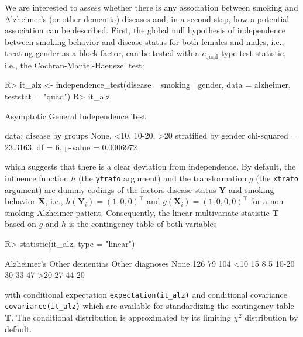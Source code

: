 \documentclass{article}
\newcommand{\Rcmd}[1]{\texttt{#1}}
\newcommand{\X}{\mathbf{X}}
\newcommand{\Y}{\mathbf{Y}}
\newcommand{\T}{\mathbf{T}}
\newenvironment{Schunk}{}{}
\begin{document}
We are interested to assess whether there is any association
between smoking and Alzheimer's (or other dementia) diseases and, in a
second step, how a potential association can be described. First,
the global null hypothesis of independence between smoking behavior and disease
status for both females and males, i.e., treating gender as a
block factor, can be tested with a $c_\text{quad}$-type test statistic, i.e., the 
Cochran-Mantel-Haenszel test:
\begin{Schunk}
\begin{Sinput}
R> it_alz <- independence_test(disease ~ smoking | gender, 
       data = alzheimer, teststat = "quad")
R> it_alz
\end{Sinput}
\begin{Soutput}
	Asymptotic General Independence Test

data:  disease by groups None, <10, 10-20, >20 
	 stratified by gender 
chi-squared = 23.3163, df = 6, p-value = 0.0006972
\end{Soutput}
\end{Schunk}
which suggests that there is a clear deviation from independence. 
By default, the influence function $h$ (the \Rcmd{ytrafo} argument)
and the transformation $g$ (the \Rcmd{xtrafo} argument)
are dummy codings of the factors disease status $\Y$ and smoking behavior $\X$, 
i.e., $h(\Y_i) = (1, 0, 0)^\top$ 
and $g(\X_i) = (1, 0, 0 ,0)^\top$ for a non-smoking Alzheimer patient. 
Consequently, the linear multivariate statistic $\T$ based on $g$ and $h$ 
is the contingency table of both variables 
\begin{Schunk}
\begin{Sinput}
R> statistic(it_alz, type = "linear")
\end{Sinput}
\begin{Soutput}
      Alzheimer's Other dementias Other diagnoses
None          126              79             104
<10            15               8               5
10-20          30              33              47
>20            27              44              20
\end{Soutput}
\end{Schunk}
with conditional expectation \Rcmd{expectation(it\_alz)} and conditional
covariance \Rcmd{covariance(it\_alz)} which are available for standardizing
the contingency table $\T$. The conditional distribution is approximated by
its limiting $\chi^2$ distribution by default. 
\end{document}
